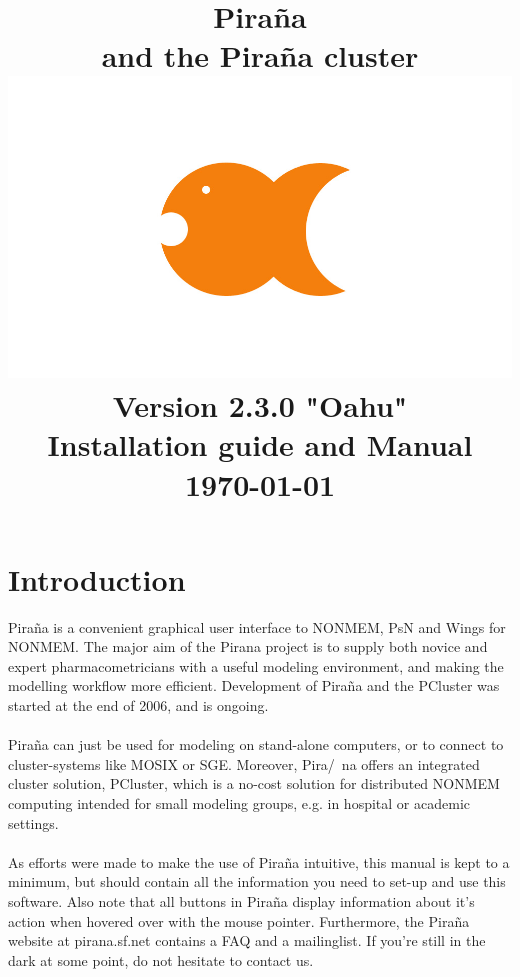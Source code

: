 \documentclass[a4,11pt]{report} \usepackage[pdftex]{graphicx}
\begin{document}
\title{\textbf{\textcolor{PiranaOrange}{Pira\~na}\scriptsize\\ and the
Pira\~na cluster}\\ \vspace{15pt}
\includegraphics[scale=0.12]{images/pirana_logo.jpg} \\ \vspace{15pt}
\scriptsize Version 2.3.0 "Oahu"\\Installation guide and Manual \\
\vspace{5pt} \scriptsize {\today} \\
\date{}}
\maketitle

\tableofcontents

\chapter{Introduction} \textcolor{PiranaOrange}{Pira\~na} is a
convenient graphical user interface to NONMEM, PsN and Wings for
NONMEM. The major aim of the Pirana project is to supply both novice
and expert pharmacometricians with a useful modeling environment, and
making the modelling workflow more efficient. Development of Pira\~na
and the
PCluster was started at the end of 2006, and is ongoing.  \\
\vspace{1pt}\\ Pira\~na can just be used for modeling on stand-alone
computers, or to connect to cluster-systems like MOSIX or
SGE. Moreover, Pira/~na offers an integrated cluster solution,
PCluster, which is a no-cost solution for distributed NONMEM computing
intended for small modeling groups, e.g. in hospital or academic settings. \\
\vspace{1pt}\\ As efforts were made to make the use of Pira\~na
intuitive, this manual is kept to a minimum, but should contain all
the information you need to set-up and use this software. Also note
that all buttons in Pira\~na display information about it's action
when hovered over with the mouse pointer. Furthermore, the Pira\~na
website at pirana.sf.net contains a FAQ and a mailinglist. If you're
still in the dark at some point, do not hesitate to contact us.
\end{document}
